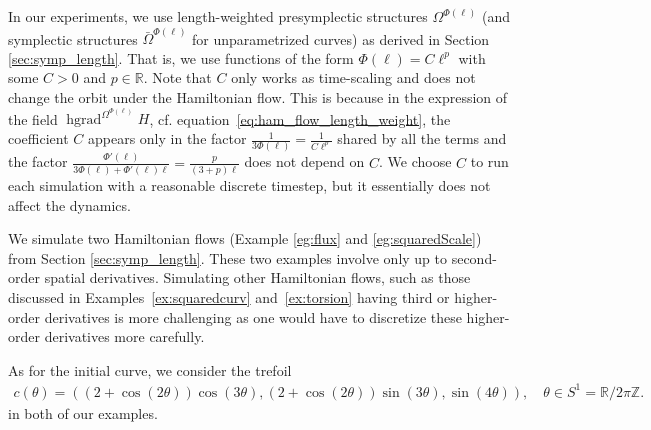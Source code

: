 \documentclass[12pt]{amsart}
\theoremstyle{definition}
\newcommand{\R}{\mathbb R}
\newcommand{\Z}{\mathbb Z}
\def\th{\theta}
\def\Om{\Omega}
\def\R{{\mathbb R}}
\let\on=\operatorname
\begin{document}
In our experiments, we use length-weighted presymplectic structures $\Om^{\Phi(\ell)}$ (and symplectic structures $\bar\Om^{\Phi(\ell)}$ for unparametrized curves) as derived in Section \ref{sec:symp_length}. That is, we use functions of the form $\Phi(\ell)=C \ell^p$ with some $C>0$ and $p\in \R$. Note that $C$ only works as time-scaling and does not change the orbit under the Hamiltonian flow. This is because in the expression of the field $\on{hgrad}^{\Om^{\Phi(\ell)}} H$, cf. equation~\eqref{eq:ham_flow_length_weight}, the coefficient $C$ appears only in the factor $\frac{1}{3\Phi(\ell)}=\frac{1}{C \ell^p}$ shared by all the terms and the factor $\frac{\Phi'(\ell)}{3\Phi(\ell)+\Phi'(\ell)\ell}=\frac{p}{(3+p)\ell}$ does not depend on $C$. We choose $C$ to run each simulation with a reasonable discrete timestep, but it essentially does not affect the dynamics. 

We simulate two Hamiltonian flows (Example \ref{eg:flux} and \ref{eg:squaredScale}) from Section \ref{sec:symp_length}. These two examples involve only up to second-order spatial derivatives. Simulating other Hamiltonian flows, such as those discussed in Examples~\ref{ex:squaredcurv} and~\ref{ex:torsion} having third or higher-order derivatives is more challenging as one would have to discretize these higher-order derivatives more carefully.

As for the initial curve, we consider the trefoil
\begin{align}\label{eq:trefoil}
    c(\theta)=  
    \left((2 + \cos(2\th))\cos(3\th),(2 + \cos(2\th)) \sin(3\th), \sin(4\th)\right), \quad
\theta \in S^1=\R/2\pi\Z.
\end{align}
in both of our examples.

\end{document}
